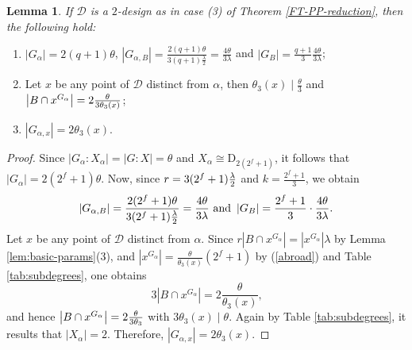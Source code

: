 \documentclass[a4paper,twopage,reqno,12pt]{amsart}
\newtheorem{lemma}[theorem]{Lemma}
\theoremstyle{definition}
\numberwithin{equation}{section}
\newcommand{\D}{\mathrm{D}}
\begin{document}
\begin{lemma}\label{I.1}
If $\mathcal{D}$ is a $2$-design as in case (3) of Theorem \ref{FT-PP-reduction}, then the following hold:
\end{lemma}

\begin{enumerate}
\item %
$\left\vert G_{\alpha }\right\vert =2(q+1)\theta$, $\left\vert
G_{\alpha ,B}\right\vert =\frac{2(q+1)\theta }{3(q+1)\frac{\lambda }{2}}=%
\frac{4\theta }{3\lambda }$ and $\left\vert G_{B}\right\vert =\frac{q+1%
}{3}\frac{4\theta }{3\lambda }$; 

\item Let $x$ be any point of $\mathcal{D}$ distinct from $\alpha$, then $\theta_{3}(x) \mid \frac{\theta}{3}$ and $\left\vert B\cap x^{G_{\alpha }}\right\vert =2\frac{\theta }{%
3\theta _{3}(x)}$;

\item $\left\vert G_{\alpha ,x}\right\vert =2\theta_{3}(x)$.
\end{enumerate}

\begin{proof}
Since $\left\vert G_{\alpha }:X_{\alpha }\right\vert =\left\vert
G:X\right\vert =\theta $ and $X_{\alpha}\cong \D_{2(2^f+1)}$, it follows that $\left\vert G_{\alpha }\right\vert=2(2^f+1)\theta $. Now, since $r=3(2^f+1)\frac{%
\lambda }{2}$ and $k=\frac{2^f+1}{3}$, we obtain
\[
\left\vert G_{\alpha ,B}\right\vert =\frac{2(2^f+1)\theta }{3(2^f+1)\frac{%
\lambda }{2}}=\frac{4\theta }{3\lambda }\text{ and }\left\vert
G_{B}\right\vert =\frac{2^f+1}{3}\cdot \frac{4\theta }{3\lambda} \text{.} 
\]%
Let $x$ be any point of $\mathcal{D}$ distinct from $\alpha$. Since $r\left\vert B\cap x^{G_{\alpha }}\right\vert  =\left\vert x^{G_{\alpha
}}\right\vert \lambda$ by Lemma \ref{lem:basic-params}(3), and $\left\vert x^{G_{\alpha
}}\right\vert=\frac{\theta}{\theta_{3}(x)}(2^f+1)$ by (\ref{abroad}) and Table \ref{tab:subdegrees}, one obtains
\begin{equation*}
3\left\vert B\cap x^{G_{\alpha }}\right\vert  =2\frac{\theta }{\theta _{3}(x)}\text{,}    
\end{equation*}
and hence $\left\vert B\cap x^{G_{\alpha }}\right\vert =2\frac{\theta }{%
3\theta _{3}}$ with $3\theta_{3}(x) \mid \theta$. Again by Table \ref{tab:subdegrees}, it results that $\left\vert X_{\alpha}\right\vert=2$. Therefore, $\left\vert G_{\alpha ,x}\right\vert =2\theta_{3}(x)$.
\end{proof}
\end{document}
